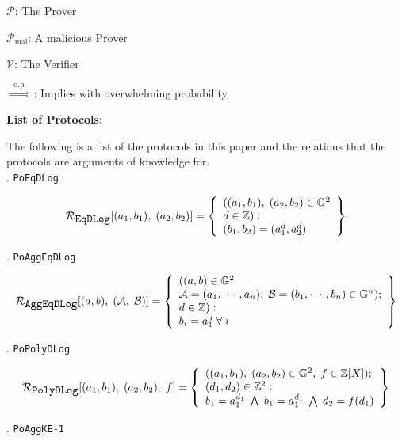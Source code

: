 \documentclass[11pt, lettersize, notitlepage, leqno, footskip=0.6cm]{article}
\newcommand{\bz}{\mathbb Z}
\newcommand{\impop}{\overset{\;\;\mr{o.p.}\;\;}{\Longrightarrow}}
\newcommand{\mc}{\mathcal}
\newcommand{\mb}{\mathbb}
\newcommand{\mr}{\mathrm}
\newcommand{\noin}{\noindent}
\numberwithin{equation}{section}
\begin{document}
{\noin $\mc{P}$: The Prover

\noin $\mc{P}_{\mr{mal}}$: A malicious Prover

\noin $\mc{V}$: The Verifier

\noin $\impop$: Implies with overwhelming probability

\bigskip \begin{center} \textbf{List of Protocols:}

\end{center}

The following is a list of the protocols in this paper and the relations that the protocols are arguments of knowledge for.\\

\noin 1. \verb|PoEqDLog| \vspace{-0.3cm}

\[
  \mc{R}_{{\protect\verb|EqDLog|}}[(a_1, b_1),\;(a_2,b_2)] = \left\{\begin{array}{l}
    ((a_1, b_1), \; (a_2,b_2)\in\mb{G}^2\\
    d\in\mb{Z}): \\
    (b_1,b_2) = (a_1^d,a_2^d)
  \end{array}\right\}
\]

\noin 2. \verb|PoAggEqDLog| \vspace{-0.3cm}

\[
  \mc{R}_{{\protect\verb|AggEqDLog|}}[(a, b),\;(\mc{A},\;\mc{B})] = \left\{\begin{array}{l}
  	((a, b)\in\mb{G}^2\\
    \mc{A} = (a_1, \cdots, a_n),\;\mc{B} = (b_1,\cdots, b_n)\in\mb{G}^n);\\
    d\in\mb{Z}): \\
    b_i = a_1^{d} \;\forall\;i
  \end{array}\right\}
\]
 

\noin 3. \verb|PoPolyDLog| \vspace{-0.3cm}

\[
  \mc{R}_{{\protect\verb|PolyDLog|}}[(a_1, b_1),\;(a_2,b_2),\;f] = \left\{\begin{array}{l}
    ((a_1, b_1), \; (a_2,b_2)\in\mb{G}^2,\;f\in\bz[X]);\\
    (d_1, d_2)\in\mb{Z}^2: \\
    b_1 = a_1^{d_1}\; \bigwedge\; b_1 = a_1^{d_1}\; \bigwedge \;d_2 = f(d_1)
  \end{array}\right\}
\]

\noin 4. \verb|PoAggKE-1| \vspace{-0.3cm}

}
\end{document}
